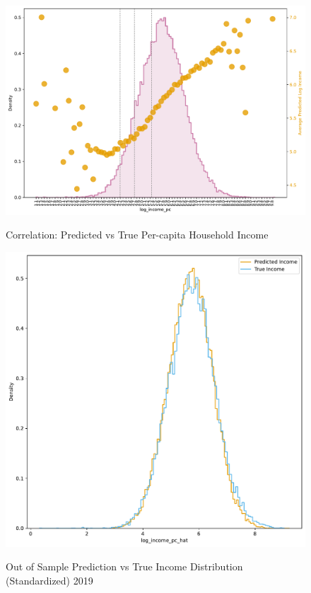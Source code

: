 \begin{figure}[H]
    \centering
    \caption{Correlation: Predicted vs True Per-capita Household Income}
    \includegraphics[width=1\textwidth]{../figures/fig0_binned_scatterplot.pdf}
    \label{fig:enter-label}
\end{figure}



\begin{figure}[H]
    \centering
    \caption{Out of Sample Prediction vs True Income Distribution (Standardized) 2019}
    \includegraphics[width=1\textwidth]{../figures/fig1c_prediction_vs_true_income_distribution_lasso_training_weighted.pdf}
    \label{fig:enter-label}
\end{figure}




